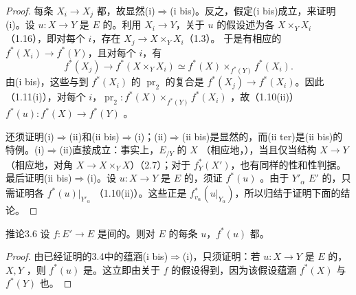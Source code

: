 \begin{proof}
每条 $X_i\to X_j$ 都，故显然(i)$\Rightarrow$(i bis)。反之，假定(i bis)成立，来证明(i)。设 $u:X\to Y$ 是 $E$ 的。利用 $X_i\to Y$，关于 $u$ 的假设述为各 $X\times_Y X_i$ （1.16），即对每个 $i$，存在 $X_j\to X\times_Y X_i$（1.3）。
于是有相应的 $f^*(X_i)\to f^*(Y)$，且对每个 $i$，有
\[
f^*(X_j)\longrightarrow f^*(X\times_Y X_i)
\simeq f^*(X)\mathbin{\times}_{f^*(Y)}f^*(X_i).
\]
由(i bis)，这些与到 $f^*(X_i)$ 的 $\operatorname{pr}_2$ 的复合是 $f^*(X_j)\to f^*(X_i)$。因此（1.11(i)），对每个 $i$，$\operatorname{pr}_2:f^*(X)\times_{f^*(Y)}f^*(X_i)$ ，故（1.10(ii)）$f^*(u):f^*(X)\to f^*(Y)$ 。

还须证明(i)$\Rightarrow$(ii)和(ii bis)$\Rightarrow$(i)；(ii)$\Rightarrow$(ii bis)是显然的，而(ii ter)是(ii bis)的特例。(i)$\Rightarrow$(ii)直接成立：事实上，$E_{/Y}$ 的 $X$ （相应地，），当且仅当结构 $X\to Y$（相应地，对角 $X\to X\times_Y X$）（2.7）；对于 $f_Y^*(X')$，也有同样的性和性判据。最后证明(ii bis)$\Rightarrow$(i)。设 $u:X\to Y$ 是 $E$ 的，须证 $f^*(u)$ 。由于 $Y'_\alpha$  $E'$ 的，只需证明各 $f^*(u)|_{Y'_\alpha}$ （1.10(ii)）。这些正是 $f_{v_\alpha}^*(u|_{Y_\alpha})$，所以归结于证明下面的结论。
\end{proof}

\begin{SGAresult}{推论}{3.6}
设 $f:E'\to E$ 是间的。则对 $E$ 的每条 $u$，$f^*(u)$ 都。
\end{SGAresult}
\begin{proof}
由已经证明的3.4中的蕴涵(i bis)$\Rightarrow$(i)，只须证明：若 $u:X\to Y$ 是 $E$ 的，$X,Y$ ，则 $f^*(u)$ 是。这立即由关于 $f$ 的假设得到，因为该假设蕴涵 $f^*(X)$ 与 $f^*(Y)$ 也。
\end{proof}

